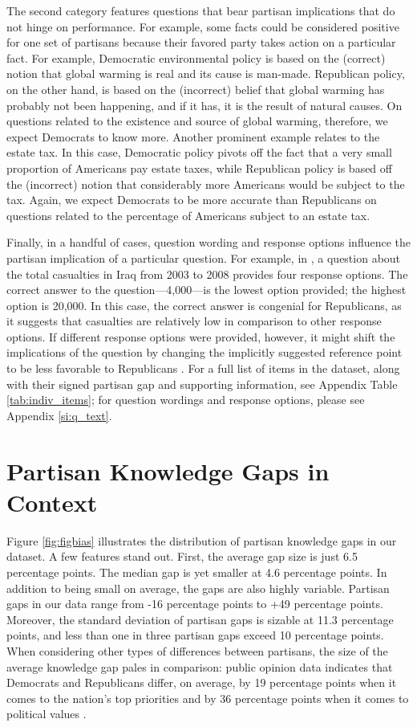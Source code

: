 \documentclass[12pt, letterpaper]{article}
\begin{document}
The second category features questions that bear partisan implications that do not hinge on performance. For example, some facts could be considered positive for one set of partisans because their favored party takes action on a particular fact. For example, Democratic environmental policy is based on the (correct) notion that global warming is real and its cause is man-made. Republican policy, on the other hand, is based on the (incorrect) belief that global warming has probably not been happening, and if it has, it is the result of natural causes. On questions related to the existence and source of global warming, therefore, we expect Democrats to know more. Another prominent example relates to the estate tax. In this case, Democratic policy pivots off the fact that a very small proportion of Americans pay estate taxes, while Republican policy is based off the (incorrect) notion that considerably more Americans would be subject to the tax. Again, we expect Democrats to be more accurate than Republicans on questions related to the percentage of Americans subject to an estate tax.

Finally, in a handful of cases, question wording and response options influence the partisan implication of a particular question. For example, in \citet{bullocketal_2015}, a question about the total casualties in Iraq from 2003 to 2008 provides four response options. The correct answer to the question---4,000---is the lowest option provided; the highest option is 20,000. In this case, the correct answer is congenial for Republicans, as it suggests that casualties are relatively low in comparison to other response options. If different response options were provided, however, it might shift the implications of the question by changing the implicitly suggested reference point to be less favorable to Republicans \citep{TverskyKahneman1974}. For a full list of items in the dataset, along with their signed partisan gap and supporting information, see Appendix Table \ref{tab:indiv_items}; for question wordings and response options, please see Appendix \ref{si:q_text}.

\section*{Partisan Knowledge Gaps in Context}

Figure \ref{fig:figbias} illustrates the distribution of partisan knowledge gaps in our dataset. A few features stand out. First, the average gap size is just 6.5 percentage points. The median gap is yet smaller at 4.6 percentage points. In addition to being small on average, the gaps are also highly variable. Partisan gaps in our data range from -16 percentage points to +49 percentage points. Moreover, the standard deviation of partisan gaps is sizable at 11.3 percentage points, and less than one in three partisan gaps exceed 10 percentage points. When considering other types of differences between partisans, the size of the average knowledge gap pales in comparison: public opinion data indicates that Democrats and Republicans differ, on average, by 19 percentage points when it comes to the nation's top priorities \citep{pew_top_priorities} and by 36 percentage points when it comes to political values \citep{pew_pol_values}. 
\end{document}

